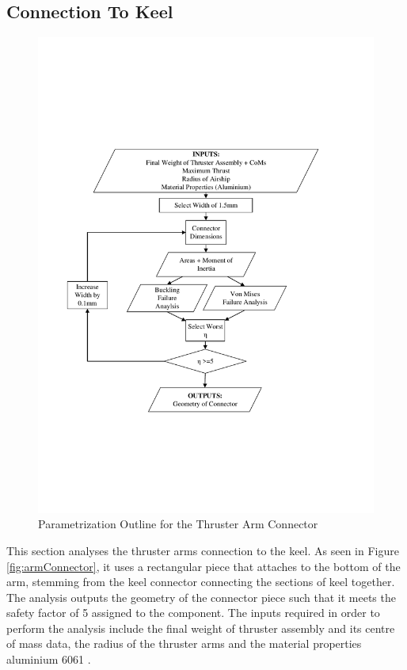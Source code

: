 \documentclass[../main.tex]{subfiles}
\begin{document}
\subsection{Connection To Keel} \label{connector}
\begin{figure}[H]
	\centering
	\includegraphics[width=.9\linewidth]{img/paramaterization/connector.pdf}
	\caption{Parametrization Outline for the Thruster Arm Connector}
	\label{fig:connectorParametrization}
\end{figure}

This section analyses the thruster arms connection to the keel. As seen in Figure \ref{fig:armConnector}, it uses a rectangular piece that attaches to the bottom of the arm, stemming from the keel connector connecting the sections of keel together. The analysis outputs the geometry of the connector piece such that it meets the safety factor of 5 assigned to the component. The inputs required in order to perform the analysis include the final weight of thruster assembly and its centre of mass data, the radius of the thruster arms and the material properties aluminium 6061 \cite{AlProperties}. \\
\end{document}
